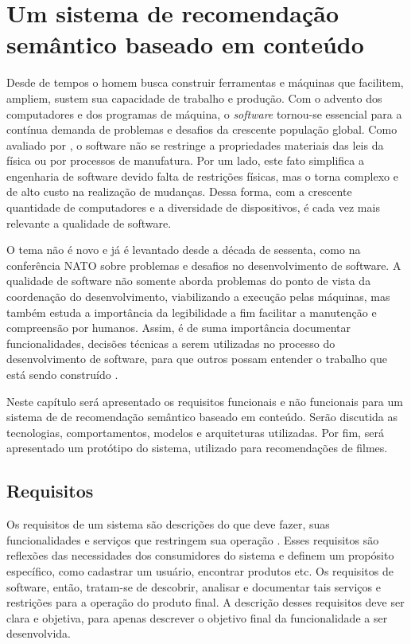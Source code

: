 
\chapter{Um sistema de recomendação semântico baseado em conteúdo}
\label{cap:proposal}

Desde de tempos o homem busca construir ferramentas e máquinas que facilitem, ampliem, sustem sua capacidade de trabalho e produção. Com o advento dos computadores e dos programas de máquina, o \textit{software} tornou-se essencial para a contínua demanda de problemas e desafios da crescente população global. Como avaliado por \cite{Sommerville2010},  o software não se restringe a propriedades materiais das leis da física ou por processos de manufatura. Por um lado, este fato simplifica a engenharia de software devido falta de restrições físicas, mas o torna complexo e de alto custo na realização de mudanças. Dessa forma, com a crescente quantidade de computadores e a diversidade de dispositivos, é cada vez mais relevante a qualidade de software.

O tema não é novo e já é levantado desde a década de sessenta, como na conferência NATO \citep{NR68} sobre problemas e desafios no desenvolvimento de software. A qualidade de software não somente aborda problemas do ponto de vista da coordenação do desenvolvimento, viabilizando a execução pelas máquinas, mas também estuda a importância da legibilidade a fim facilitar a manutenção e compreensão por humanos. Assim, é de suma importância documentar funcionalidades, decisões técnicas a serem utilizadas no processo do desenvolvimento de software, para que outros possam entender o trabalho que está sendo construído \citep{Pressman2009}.

Neste capítulo será apresentado os requisitos funcionais e não funcionais para um sistema de de recomendação semântico baseado em conteúdo. Serão discutida as tecnologias, comportamentos, modelos e arquiteturas utilizadas. Por fim, será apresentado um protótipo do sistema, utilizado para recomendações de filmes.

\section{Requisitos}

Os requisitos de um sistema são descrições do que deve fazer, suas funcionalidades e serviços que restringem sua operação \citep{Sommerville2010}. Esses requisitos são reflexões das necessidades dos consumidores do sistema e definem um propósito específico, como cadastrar um usuário, encontrar produtos etc. Os requisitos de software, então, tratam-se de descobrir, analisar e documentar tais serviços e restrições para a operação do produto final. A descrição desses requisitos deve ser clara e objetiva, para apenas descrever o objetivo final da funcionalidade a ser desenvolvida.

